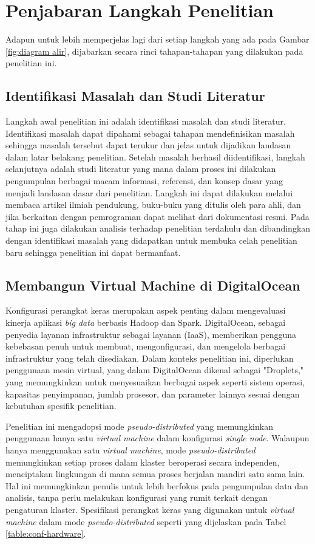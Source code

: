 \section{Penjabaran Langkah Penelitian}
Adapun untuk lebih memperjelas lagi dari setiap langkah yang ada pada Gambar \ref{fig:diagram alir}, dijabarkan secara rinci tahapan-tahapan yang dilakukan pada penelitian ini.

\subsection{Identifikasi Masalah dan Studi Literatur}
Langkah awal penelitian ini adalah identifikasi masalah dan studi literatur. Identifikasi masalah dapat dipahami sebagai tahapan mendefinisikan masalah sehingga masalah tersebut dapat terukur dan jelas untuk dijadikan landasan dalam latar belakang penelitian. Setelah masalah berhasil diidentifikasi, langkah selanjutnya adalah studi literatur yang mana dalam proses ini dilakukan pengumpulan berbagai macam informasi, referensi, dan konsep dasar yang menjadi landasan dasar dari penelitian. Langkah ini dapat dilakukan melalui membaca artikel ilmiah pendukung, buku-buku yang ditulis oleh para ahli, dan jika berkaitan dengan pemrograman dapat melihat dari dokumentasi resmi. Pada tahap ini juga dilakukan analisis terhadap penelitian terdahulu dan dibandingkan dengan identifikasi masalah yang didapatkan untuk membuka celah penelitian baru sehingga penelitian ini dapat bermanfaat. 

\subsection{Membangun Virtual Machine di DigitalOcean}
Konfigurasi perangkat keras merupakan aspek penting dalam mengevaluasi kinerja aplikasi \textit{big data} berbasis Hadoop dan Spark. DigitalOcean, sebagai penyedia layanan infrastruktur sebagai layanan (IaaS), memberikan pengguna kebebasan penuh untuk membuat, mengonfigurasi, dan mengelola berbagai infrastruktur yang telah disediakan. Dalam konteks penelitian ini, diperlukan penggunaan mesin virtual, yang dalam DigitalOcean dikenal sebagai "Droplets," yang memungkinkan untuk menyesuaikan berbagai aspek seperti sistem operasi, kapasitas penyimpanan, jumlah prosesor, dan parameter lainnya sesuai dengan kebutuhan spesifik penelitian.

Penelitian ini mengadopsi mode \textit{pseudo-distributed} yang memungkinkan penggunaan hanya satu \textit{virtual machine} dalam konfigurasi \textit{single node}. Walaupun hanya menggunakan satu \textit{virtual machine}, mode \textit{pseudo-distributed} memungkinkan setiap proses dalam klaster beroperasi secara independen, menciptakan lingkungan di mana semua proses berjalan mandiri satu sama lain. Hal ini memungkinkan penulis untuk lebih berfokus pada pengumpulan data dan analisis, tanpa perlu melakukan konfigurasi yang rumit terkait dengan pengaturan klaster. Spesifikasi perangkat keras yang digunakan untuk \textit{virtual machine} dalam mode \textit{pseudo-distributed} seperti yang dijelaskan pada Tabel \ref{table:conf-hardware}.

